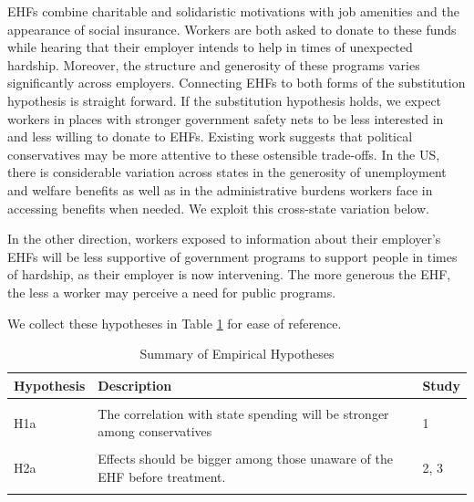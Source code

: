 \documentclass[
  11pt,
  oneside]{article}
\begin{document}
EHFs combine charitable and solidaristic motivations with job amenities and the appearance of social insurance. Workers are both asked to donate to these funds while hearing that their employer intends to help in times of unexpected hardship. Moreover, the structure and generosity of these programs varies significantly across employers. Connecting EHFs to both forms of the substitution hypothesis is straight forward. If the substitution hypothesis holds, we expect workers in places with stronger government safety nets to be less interested in and less willing to donate to EHFs. Existing work suggests that political conservatives may be more attentive to these ostensible trade-offs. In the US, there is considerable variation across states in the generosity of unemployment and welfare benefits as well as in the administrative burdens workers face in accessing benefits when needed. We exploit this cross-state variation below.

In the other direction, workers exposed to information about their employer's EHFs will be less supportive of government programs to support people in times of hardship, as their employer is now intervening. The more generous the EHF, the less a worker may perceive a need for public programs.

We collect these hypotheses in Table \ref{tab:tab-hypotheses} for ease of reference.

\begin{table}[!h]
\centering
\caption{\label{tab:tab-hypotheses}Summary of Empirical Hypotheses}
\centering
\begin{tabular}[t]{l>{\raggedright\arraybackslash}p{10cm}l}
\toprule
Hypothesis & Description & Study\\
\midrule
\cellcolor{gray!10}{H1} & \cellcolor{gray!10}{Workers in states with more generous social spending regimes will be less supportive of EHFs and less willing to donate.} & \cellcolor{gray!10}{1, 3}\\
H1a & The correlation with state spending will be stronger among conservatives & 1\\
\cellcolor{gray!10}{H2} & \cellcolor{gray!10}{Exposure to EHF messaging reduces support for government spending on social insurance and welfare.} & \cellcolor{gray!10}{2, 3}\\
H2a & Effects should be bigger among those unaware of the EHF before treatment. & 2, 3\\
\cellcolor{gray!10}{H2b} & \cellcolor{gray!10}{Effects should be bigger where the EHF is more generous.} & \cellcolor{gray!10}{2, 3}\\
\bottomrule
\end{tabular}
\end{table}
\end{document}
